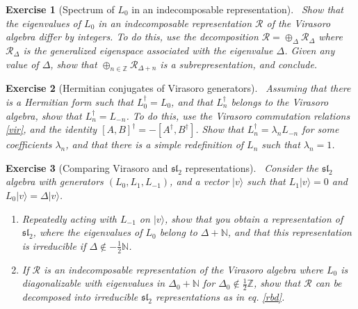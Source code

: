 \documentclass[12pt, a4paper, notitlepage, twoside]{report}
\numberwithin{equation}{section}
\theoremstyle{break}
\newtheorem{exo}{Exercise}[chapter]
\begin{document}
\begin{exo}[Spectrum of $L_0$ in an indecomposable representation]
 ~\label{exodiffint}
Show that the eigenvalues of $L_0$ in an indecomposable representation $\mathcal{R}$ of the Virasoro algebra differ by integers.
To do this, use the decomposition $\mathcal{R}=\oplus_\Delta \mathcal{R}_\Delta$ where $\mathcal{R}_\Delta$ is the generalized eigenspace associated with the eigenvalue $\Delta$.
Given any value of $\Delta$, show that  $\oplus_{n\in{\mathbb{Z}}} \mathcal{R}_{\Delta+n}$ is a subrepresentation, and conclude. 
\end{exo}

\begin{exo}[Hermitian conjugates of Virasoro generators]
 ~\label{exolnd}
Assuming that there is a Hermitian form such that $L_0^\dagger = L_0$, and that $L_n^\dagger$ belongs to the Virasoro algebra, show that $L_n^\dagger = L_{-n}$. To do this, use the Virasoro commutation relations \eqref{vir}, and the identity $[A,B]^\dagger = -[A^\dagger, B^\dagger]$. Show that $L_n^\dagger = \lambda_n L_{-n}$ for some coefficients $\lambda_n$, and that there is a simple redefinition of $L_n$ such that $\lambda_n=1$.
\end{exo}

\begin{exo}[Comparing Virasoro and $\mathfrak{sl}_2$ representations]
 ~\label{exodis}
Consider the $\mathfrak{sl}_2$ algebra with generators $(L_0,L_1,L_{-1})$, and a vector $|v\rangle$ such that $L_1|v\rangle = 0 $ and $L_0|v\rangle = \Delta |v\rangle$.
\begin{enumerate}
 \item 
Repeatedly acting with $L_{-1}$ on $|v\rangle$, show that you obtain a representation of $\mathfrak{sl}_2$, where the eigenvalues of $L_0$ belong to $\Delta+{\mathbb{N}}$, and that this representation is irreducible if $\Delta\notin -\frac12 \mathbb{N}$.
\item
If $\mathcal{R}$ is an indecomposable representation of the Virasoro algebra where $L_0$ is diagonalizable with eigenvalues in $\Delta_0+\mathbb{N}$ for $\Delta_0\notin\frac12 \mathbb{Z}$, show that $\mathcal{R}$ can be decomposed into irreducible $\mathfrak{sl}_2$ representations as in eq. \eqref{rbd}.
\end{enumerate}
\end{exo}
\end{document}
